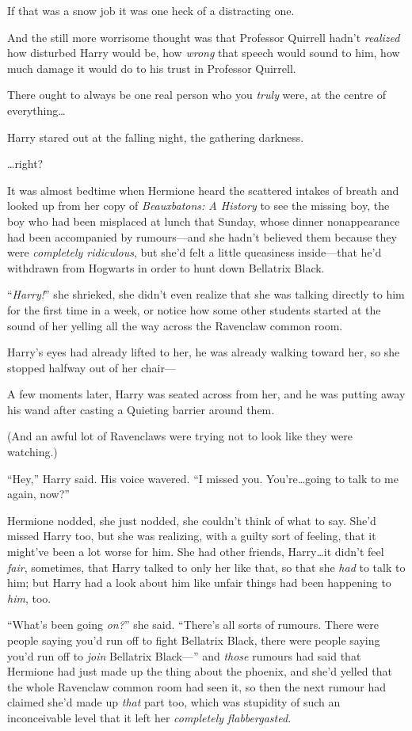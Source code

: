 If that was a snow job it was one heck of a distracting one.

And the still more worrisome thought was that Professor Quirrell hadn’t \emph{realized} how disturbed Harry would be, how \emph{wrong} that speech would sound to him, how much damage it would do to his trust in Professor Quirrell.

There ought to always be one real person who you \emph{truly} were, at the centre of everything…

Harry stared out at the falling night, the gathering darkness.

…right?

\later

It was almost bedtime when Hermione heard the scattered intakes of breath and looked up from her copy of \emph{Beauxbatons: A History} to see the missing boy, the boy who had been misplaced at lunch that Sunday, whose dinner nonappearance had been accompanied by rumours—and she hadn’t believed them because they were \emph{completely ridiculous}, but she’d felt a little queasiness inside—that he’d withdrawn from Hogwarts in order to hunt down Bellatrix Black.

“\emph{Harry!}” she shrieked, she didn’t even realize that she was talking directly to him for the first time in a week, or notice how some other students started at the sound of her yelling all the way across the Ravenclaw common room.

Harry’s eyes had already lifted to her, he was already walking toward her, so she stopped halfway out of her chair—

A few moments later, Harry was seated across from her, and he was putting away his wand after casting a Quieting barrier around them.

(And an awful lot of Ravenclaws were trying not to look like they were watching.)

“Hey,” Harry said. His voice wavered. “I missed you. You’re…going to talk to me again, now?”

Hermione nodded, she just nodded, she couldn’t think of what to say. She’d missed Harry too, but she was realizing, with a guilty sort of feeling, that it might’ve been a lot worse for him. She had other friends, Harry…it didn’t feel \emph{fair}, sometimes, that Harry talked to only her like that, so that she \emph{had} to talk to him; but Harry had a look about him like unfair things had been happening to \emph{him}, too.

“What’s been going \emph{on?}” she said. “There’s all sorts of rumours. There were people saying you’d run off to fight Bellatrix Black, there were people saying you’d run off to \emph{join} Bellatrix Black—” and \emph{those} rumours had said that Hermione had just made up the thing about the phoenix, and she’d yelled that the whole Ravenclaw common room had seen it, so then the next rumour had claimed she’d made up \emph{that} part too, which was stupidity of such an inconceivable level that it left her \emph{completely flabbergasted.}

